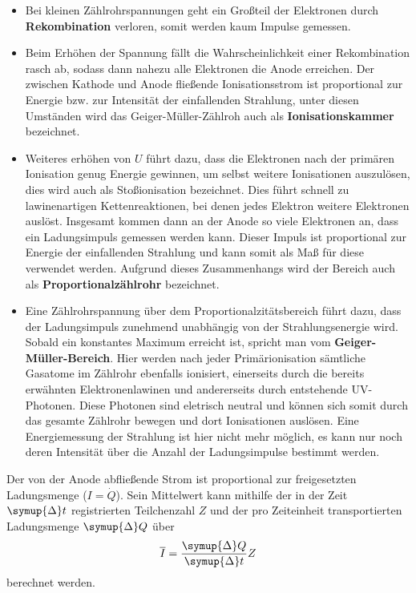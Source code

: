 \begin{itemize}
\item Bei kleinen Zählrohrspannungen geht ein Großteil der Elektronen durch \textbf{Rekombination} verloren, somit
werden kaum Impulse gemessen.
\item Beim Erhöhen der Spannung fällt die Wahrscheinlichkeit einer Rekombination rasch ab,
sodass dann nahezu alle Elektronen die Anode erreichen. Der zwischen Kathode und Anode fließende
Ionisationsstrom ist proportional zur Energie bzw. zur Intensität der einfallenden Strahlung, unter diesen Umständen
wird das Geiger-Müller-Zählroh auch als \textbf{Ionisationskammer} bezeichnet.
\item Weiteres erhöhen von $U$ führt dazu, dass die Elektronen nach der primären Ionisation genug Energie gewinnen,
um selbst weitere Ionisationen auszulösen, dies wird auch als Stoßionisation bezeichnet. Dies führt schnell zu
lawinenartigen Kettenreaktionen, bei denen jedes Elektron weitere Elektronen auslöst. Insgesamt kommen dann
an der Anode so viele Elektronen an, dass ein Ladungsimpuls gemessen werden kann. Dieser Impuls ist proportional
zur Energie der einfallenden Strahlung und kann somit als Maß für diese verwendet werden. Aufgrund dieses Zusammenhangs
wird der Bereich auch als \textbf{Proportionalzählrohr} bezeichnet.
\item Eine Zählrohrspannung über dem Proportionalzitätsbereich führt dazu, dass der Ladungsimpuls zunehmend unabhängig von der
Strahlungsenergie wird. Sobald ein konstantes Maximum erreicht ist, spricht man vom \textbf{Geiger-Müller-Bereich}.
Hier werden nach jeder Primärionisation sämtliche Gasatome im Zählrohr ebenfalls ionisiert, einerseits durch die bereits erwähnten
Elektronenlawinen und andererseits durch entstehende UV-Photonen. Diese Photonen sind eletrisch neutral und können sich somit durch das
gesamte Zählrohr bewegen und dort Ionisationen auslösen.
Eine Energiemessung der Strahlung ist hier nicht mehr möglich, es kann nur noch deren Intensität über die
Anzahl der Ladungsimpulse bestimmt werden.
\end{itemize}
Der von der Anode abfließende Strom ist proportional zur freigesetzten Ladungsmenge ($I = \dot{Q}$).
Sein Mittelwert kann mithilfe der in der Zeit $\symup{\Delta}t$ registrierten Teilchenzahl $Z$ und der pro Zeiteinheit
transportierten Ladungsmenge $\symup{\Delta}Q$ über 
\begin{equation}
  \label{eq:strom}
  \overline{I} = \frac{\symup{\Delta}Q}{\symup{\Delta}t}Z
\end{equation} 
berechnet werden.


